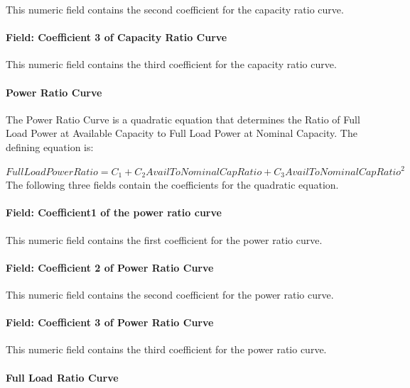 This numeric field contains the second coefficient for the capacity ratio curve.

\paragraph{Field: Coefficient 3 of Capacity Ratio Curve}\label{field-coefficient-3-of-capacity-ratio-curve}

This numeric field contains the third coefficient for the capacity ratio curve.

\paragraph{Power Ratio Curve}\label{power-ratio-curve}

The Power Ratio Curve is a quadratic equation that determines the Ratio of Full Load Power at Available Capacity to Full Load Power at Nominal Capacity. The defining equation is:

\(FullLoadPowerRatio = {C_1} + {C_2}AvailToNominalCapRatio + {C_3}AvailToNominalCapRati{o^2}\) The following three fields contain the coefficients for the quadratic equation.

\paragraph{Field: Coefficient1 of the power ratio curve}\label{field-coefficient1-of-the-power-ratio-curve}

This numeric field contains the first coefficient for the power ratio curve.

\paragraph{Field: Coefficient 2 of Power Ratio Curve}\label{field-coefficient-2-of-power-ratio-curve}

This numeric field contains the second coefficient for the power ratio curve.

\paragraph{Field: Coefficient 3 of Power Ratio Curve}\label{field-coefficient-3-of-power-ratio-curve}

This numeric field contains the third coefficient for the power ratio curve.

\paragraph{Full Load Ratio Curve}\label{full-load-ratio-curve}

